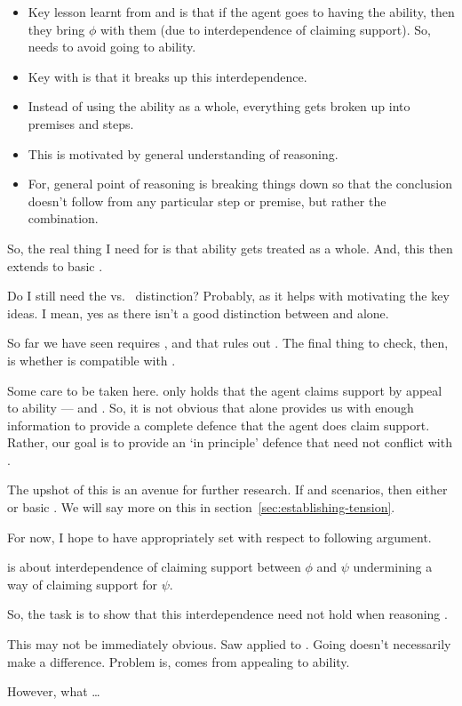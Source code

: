 {
  \color{red}
  \begin{itemize}
  \item Key lesson learnt from \nI{} and \adA{} is that if the agent goes to having the ability, then they bring \(\phi\) with them (due to interdependence of claiming support).
    So, \adB{} needs to avoid going to ability.
  \item Key with \adB{} is that it breaks up this interdependence.
  \item Instead of using the ability as a whole, everything gets broken up into premises and steps.
  \item This is motivated by general understanding of reasoning.
  \item For, general point of reasoning is breaking things down so that the conclusion doesn't follow from any particular step or premise, but rather the combination.
  \end{itemize}

  So, the real thing I need for \adA{} is that ability gets treated as a whole.
  And, this then extends to basic \AR{}.

  Do I still need the \adB{} vs.\ \adA{} distinction?
  Probably, as it helps with motivating the key ideas.
  I mean, yes as there isn't a good distinction between \AR{} and \WR{} alone.
}

\begin{note}
  So far we have seen \ESU{} requires \adA{}, and that \nI{} rules out \adA{}.
  The final thing to check, then, is whether \adB{} is compatible with \nI{}.

  Some care to be taken here.
  \adB{} only holds that the agent claims support by appeal to ability --- \AR{} and \WR{}.
  So, it is not obvious that \adB{} alone provides us with enough information to provide a complete defence that the agent does claim support.
  Rather, our goal is to provide an `in principle' defence that \adB{} need not conflict with \nI{}.

  The upshot of this is an avenue for further research.
  If \nI{} and scenarios, then either \adB{} or basic \AR{}.
  We will say more on this in section~\ref{sec:establishing-tension}.

  For now, I hope to have appropriately set  with respect to following argument.
\end{note}

\begin{note}
  \nI{} is about interdependence of claiming support between \(\phi\) and \(\psi\) undermining a way of claiming support for \(\psi\).

  So, the task is to show that this interdependence need not hold when reasoning \adB{}.

  This may not be immediately obvious.
  Saw \nI{} applied to \adA{}.
  Going \adB{} doesn't necessarily make a difference.
  {
    \color{red}
    Problem is, comes from appealing to ability.
  }

  However, what \adB{} \dots
\end{note}

